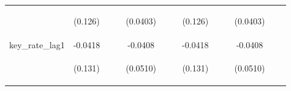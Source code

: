 \documentclass[]{article}
\begin{document}
\begin{center}
\begin{tabular}{lcccccccccccc}
\vspace{4pt} & \begin{footnotesize}(0.126)\end{footnotesize} & \begin{footnotesize}\end{footnotesize} & \begin{footnotesize}\end{footnotesize} & \begin{footnotesize}(0.0403)\end{footnotesize} & \begin{footnotesize}\end{footnotesize} & \begin{footnotesize}\end{footnotesize} & \begin{footnotesize}(0.126)\end{footnotesize} & \begin{footnotesize}\end{footnotesize} & \begin{footnotesize}\end{footnotesize} & \begin{footnotesize}(0.0403)\end{footnotesize} & \begin{footnotesize}\end{footnotesize} & \begin{footnotesize}\end{footnotesize} \\
key\_rate\_lag1 & -0.0418 &  &  & -0.0408 &  &  & -0.0418 &  &  & -0.0408 &  &  \\
\vspace{4pt} & \begin{footnotesize}(0.131)\end{footnotesize} & \begin{footnotesize}\end{footnotesize} & \begin{footnotesize}\end{footnotesize} & \begin{footnotesize}(0.0510)\end{footnotesize} & \begin{footnotesize}\end{footnotesize} & \begin{footnotesize}\end{footnotesize} & \begin{footnotesize}(0.131)\end{footnotesize} & \begin{footnotesize}\end{footnotesize} & \begin{footnotesize}\end{footnotesize} & \begin{footnotesize}(0.0510)\end{footnotesize} & \begin{footnotesize}\end{footnotesize} & \begin{footnotesize}\end{footnotesize} \\

\end{tabular}
\end{center}
\end{document}
